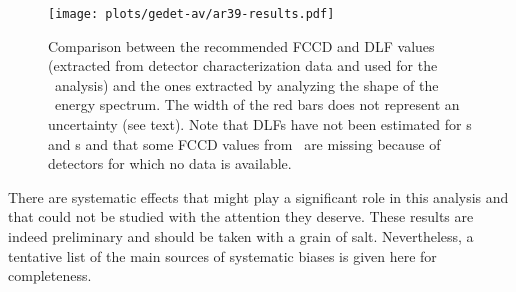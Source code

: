 \begin{figure}
  \centering
  \texttt{[image: plots/gedet-av/ar39-results.pdf]}
  \caption{%
    Comparison between the recommended FCCD and DLF values (extracted from detector
    characterization data and used for the \onbb\ analysis) and the ones extracted by
    analyzing the shape of the \Arl\ energy spectrum. The width of the red bars does not
    represent an uncertainty (see text). Note that DLFs have not been estimated for
    \scoax{}s and \icoax{}s and that some FCCD values from \Arl\ are missing because of
    detectors for which no data is available.
  }\label{fig:gedetav:ar39-results}
\end{figure}

There are systematic effects that might play a significant role in this analysis and that
could not be studied with the attention they deserve. These results are indeed preliminary
and should be taken with a grain of salt. Nevertheless, a tentative list of the main
sources of systematic biases is given here for completeness.
